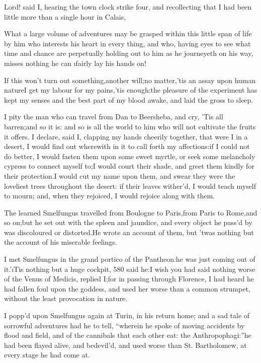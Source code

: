 \documentclass[twoside]{article}
\begin{document}
Lord! said I, hearing the town clock strike four, and recollecting that I
had been little more than a single hour in Calais,\tsk 

\tsk What a large volume of adventures may be grasped within this little span
of life by him who interests his heart in every thing, and who, having
eyes to see what time and chance are perpetually holding out to him as he
journeyeth on his way, misses nothing he can \i{fairly} lay his hands on!

\tsk If this won’t turn out something,\tsk another will;\tsk no matter,\tsk ’tis an assay
upon human nature\tsk I get my labour for my pains,\tsk ’tis enough;\tsk the pleasure
of the experiment has kept my senses and the best part of my blood awake,
and laid the gross to sleep.

I pity the man who can travel from Dan to Beersheba, and cry, ’Tis all
barren;\tsk and so it is: and so is all the world to him who will not
cultivate the fruits it offers.  I declare, said I, clapping my hands
cheerily together, that were I in a desert, I would find out wherewith in
it to call forth my affections:\tsk if I could not do better, I would fasten
them upon some sweet myrtle, or seek some melancholy cypress to connect
myself to;\tsk I would court their shade, and greet them kindly for their
protection.\tsk I would cut my name upon them, and swear they were the
loveliest trees throughout the desert: if their leaves wither’d, I would
teach myself to mourn; and, when they rejoiced, I would rejoice along
with them.

The learned Smelfungus travelled from Boulogne to Paris,\tsk from Paris to
Rome,\tsk and so on;\tsk but he set out with the spleen and jaundice, and every
object he pass’d by was discoloured or distorted.\tsk He wrote an account of
them, but ’twas nothing but the account of his miserable feelings.

I met Smelfungus in the grand portico of the Pantheon:\tsk he was just coming
out of it.\tsk ’\i{Tis nothing but a huge cockpit}, {580} said he:\tsk I wish you
had said nothing worse of the Venus of Medicis, replied I;\tsk for in passing
through Florence, I had heard he had fallen foul upon the goddess, and
used her worse than a common strumpet, without the least provocation in
nature.

I popp’d upon Smelfungus again at Turin, in his return home; and a sad
tale of sorrowful adventures had he to tell, “wherein he spoke of moving
accidents by flood and field, and of the cannibals that each other eat:
the Anthropophagi:”\tsk he had been flayed alive, and bedevil’d, and used
worse than St. Bartholomew, at every stage he had come at.\tsk 
\end{document}
